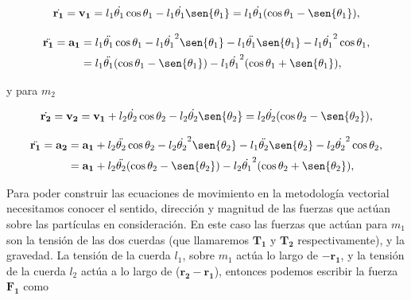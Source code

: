 \documentclass[a4paper,10pt]{article}
\numberwithin{equation}{section}
\begin{document}
\begin{equation}
 \dot{\mathbf{r_1}} = \mathbf{v_1} = l_1 \dot{\theta_1} \cos{\theta_1} - l_1 \dot{\theta_1} \sen{\theta_1} = l_1 \dot{\theta_1}(\cos{\theta_1} - \sen{\theta_1}),
 \label{eq:pendu3}
\end{equation}

\begin{align}
\begin{split}
 \ddot{\mathbf{r_1}} = \mathbf{a_1} &= l_1 \ddot{\theta_1} \cos{\theta_1} - l_1 \dot{\theta_1}^2 \sen{\theta_1} - l_1 \ddot{\theta_1} \sen{\theta_1} - l_1 \dot{\theta_1}^2 \cos{\theta_1}, \\
 &=  l_1 \ddot{\theta_1} (\cos{\theta_1} - \sen{\theta_1}) - l_1 \dot{\theta_1}^2 (\cos{\theta_1} +  \sen{\theta_1}),
 \label{eq:pendu4}
\end{split}
\end{align}

y para $m_2$

\begin{equation}
 \dot{\mathbf{r_2}} = \mathbf{v_2} = \mathbf{v_1} + l_2 \dot{\theta_2} \cos{\theta_2} - l_2 \dot{\theta_2} \sen{\theta_2} = l_2 \dot{\theta_2}(\cos{\theta_2} - \sen{\theta_2}),
 \label{eq:pendu5}
\end{equation}

\begin{align}
\begin{split}
 \ddot{\mathbf{r_1}} = \mathbf{a_2} &= \mathbf{a_1} + l_2 \ddot{\theta_2} \cos{\theta_2} - l_2 \dot{\theta_2}^2 \sen{\theta_2} - l_1 \ddot{\theta_2} \sen{\theta_2} - l_2 \dot{\theta_2}^2 \cos{\theta_2}, \\
 &= \mathbf{a_1} + l_2 \ddot{\theta_2} (\cos{\theta_2} - \sen{\theta_2}) - l_2 \dot{\theta_1}^2 (\cos{\theta_2} +  \sen{\theta_2}),
 \label{eq:pendu6}
\end{split}
\end{align}

Para poder construir las ecuaciones de movimiento en la metodología vectorial necesitamos 
conocer el sentido, dirección y magnitud de las fuerzas que actúan sobre las partículas 
en consideración. En este caso las fuerzas que actúan para $m_1$ son la tensión de las 
dos cuerdas (que llamaremos $\mathbf{T_1}$ y $\mathbf{T_2}$ respectivamente), y la gravedad.
La tensión de la cuerda $l_1$, sobre $m_1$ actúa lo largo de $-\mathbf{r_1}$, y la tensión 
de la cuerda $l_2$ actúa a lo largo de ($\mathbf{r_2} - \mathbf{r_1}$), entonces podemos 
escribir la fuerza $\mathbf{F_1}$ como
\end{document}
